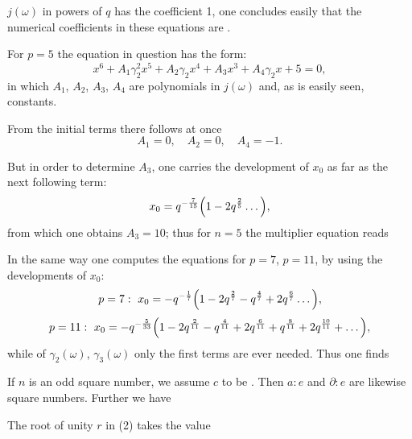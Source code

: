 $j(\omega)$ in powers of $q$ has the coefficient 1, one concludes
easily that the numerical coefficients in these equations are
.

For $p=5$ the equation in question has the form:
\[
x^6 + A_1\gamma_2^2x^5 + A_2\gamma_2x^4 + A_3x^3 + A_4\gamma_2x + 5 = 0,
\]
in which $A_1$, $A_2$, $A_3$, $A_4$ are polynomials in
$j(\omega)$ and, as is easily seen, constants.

From the initial terms there follows at once
\[
A_1 = 0, \quad A_2 = 0, \quad A_4 = -1.
\]

But in order to determine $A_3$, one carries the development of $x_0$
as far as the next following term:
\[
x_0 = q^{-\frac{7}{15}}\Bigl(1 - 2q^{\frac{2}{5}}\dots\Bigr),
\]
from which one obtains $A_3 = 10$; thus for $n=5$ the multiplier
equation reads

In the same way one computes the equations for $p=7$, $p=11$, by using
the developments of $x_0$:
\[
p=7:\ x_0 = -q^{-\frac{1}{7}}\Bigl(1 - 2q^{\frac{2}{7}} - q^{\frac{4}{7}} + 2q^{\frac{6}{7}}\dots\Bigr),
\]
\[
p=11:\ x_0 = -q^{-\frac{5}{33}}\Bigl(1 - 2q^{\frac{2}{11}} - q^{\frac{4}{11}} + 2q^{\frac{6}{11}} + q^{\frac{8}{11}} + 2q^{\frac{10}{11}} + \dots\Bigr),
\]
while of $\gamma_2(\omega)$, $\gamma_3(\omega)$ only the first terms
are ever needed. Thus one finds

If $n$ is an odd square number, we assume $c$ to be .
Then $a:e$ and $\partial:e$ are likewise square numbers. Further we
have

The root of unity $r$ in (2) takes the value
